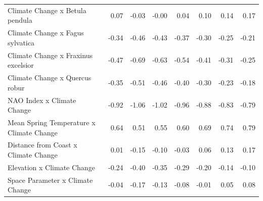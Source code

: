 \documentclass{article}\usepackage[]{graphicx}\usepackage[]{color}
\begin{document}
\begin{longtable}{lrrrrrrr}
  Climate Change
x Betula pendula & 0.07 & -0.03 & -0.00 & 0.04 & 0.10 & 0.14 & 0.17 \\ 
  Climate Change
x Fagus sylvatica & -0.34 & -0.46 & -0.43 & -0.37 & -0.30 & -0.25 & -0.21 \\ 
  Climate Change
x Fraxinus excelsior & -0.47 & -0.69 & -0.63 & -0.54 & -0.41 & -0.31 & -0.25 \\ 
  Climate Change
x Quercus robur & -0.35 & -0.51 & -0.46 & -0.40 & -0.30 & -0.23 & -0.18 \\ 
  NAO Index x Climate Change & -0.92 & -1.06 & -1.02 & -0.96 & -0.88 & -0.83 & -0.79 \\ 
  Mean Spring 
Temperature x Climate Change & 0.64 & 0.51 & 0.55 & 0.60 & 0.69 & 0.74 & 0.79 \\ 
  Distance from 
Coast x Climate Change & 0.01 & -0.15 & -0.10 & -0.03 & 0.06 & 0.13 & 0.17 \\ 
  Elevation x Climate Change & -0.24 & -0.40 & -0.35 & -0.29 & -0.20 & -0.14 & -0.10 \\ 
  Space Parameter x Climate Change & -0.04 & -0.17 & -0.13 & -0.08 & -0.01 & 0.05 & 0.08 \\ 
   \hline
\hline
\end{longtable}
\end{document}
